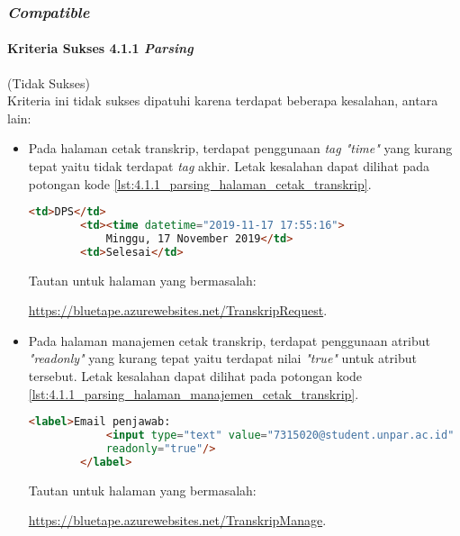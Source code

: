 \subsubsection{\textit{Compatible}}
\label{subsubsec:kepatuhan_bluetape_compatible}

\paragraph{Kriteria Sukses 4.1.1 \textit{Parsing}}
\label{par:kepatuhan_bluetape_kriteria_sukses_4.1.1}
(Tidak Sukses)\\

Kriteria ini tidak sukses dipatuhi karena terdapat beberapa kesalahan, antara lain:

\begin{itemize}
    \item Pada halaman cetak transkrip, terdapat penggunaan \textit{tag "time"} yang kurang tepat yaitu tidak terdapat \textit{tag} akhir. Letak kesalahan dapat dilihat pada potongan kode \ref{lst:4.1.1_parsing_halaman_cetak_transkrip}.
    \begin{lstlisting}[frame=single, label={lst:4.1.1_parsing_halaman_cetak_transkrip}, language=HTML, caption=Kriteria Sukses 4.1.1 - Kesalahan Elemen pada Halaman Cetak Transkrip]
        <td>DPS</td>
        <td><time datetime="2019-11-17 17:55:16">
            Minggu, 17 November 2019</td>
        <td>Selesai</td>
    \end{lstlisting}
    Tautan untuk halaman yang bermasalah: 
    
    \url{https://bluetape.azurewebsites.net/TranskripRequest}.
    
    \item Pada halaman manajemen cetak transkrip, terdapat penggunaan atribut \textit{"readonly"} yang kurang tepat yaitu terdapat nilai \textit{"true"} untuk atribut tersebut. Letak kesalahan dapat dilihat pada potongan kode \ref{lst:4.1.1_parsing_halaman_manajemen_cetak_transkrip}.
    \begin{lstlisting}[frame=single, label={lst:4.1.1_parsing_halaman_manajemen_cetak_transkrip}, language=HTML, caption=Kriteria Sukses 4.1.1 - Kesalahan Elemen pada Halaman Manajemen Cetak Transkrip]
        <label>Email penjawab:
            <input type="text" value="7315020@student.unpar.ac.id"
            readonly="true"/>
        </label>
    \end{lstlisting}
    Tautan untuk halaman yang bermasalah: 
    
    \url{https://bluetape.azurewebsites.net/TranskripManage}.


\end{itemize}
